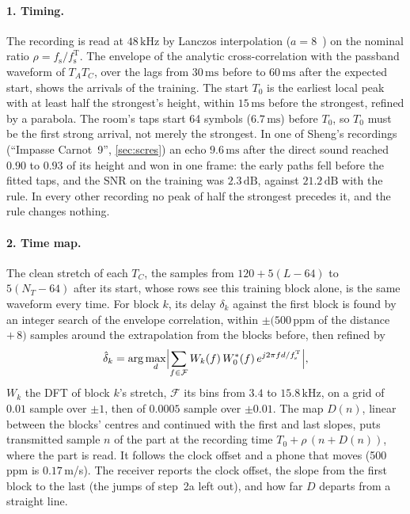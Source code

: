 \documentclass[11pt,a4paper]{article}
\newcommand{\kHz}{\,\mathrm{kHz}}
\newcommand{\ms}{\,\mathrm{ms}}
\newcommand{\dB}{\,\mathrm{dB}}
\newcommand{\fsT}{f_{\mathrm{s}}^{\mathrm{T}}}
\newcommand{\fs}{f_{\mathrm{s}}}
\theoremstyle{remark}
\begin{document}
\paragraph{1. Timing.}
The recording is read at $48\kHz$ by Lanczos interpolation ($a = 8$~\cite{duchon}) on the nominal ratio $\rho = \fs/\fsT$. The envelope of the analytic cross-correlation with the passband waveform of $T_A T_C$, over the lags from $30\ms$ before to $60\ms$ after the expected start, shows the arrivals of the training. The start $T_0$ is the earliest local peak with at least half the strongest's height, within $15\ms$ before the strongest, refined by a parabola. The room's taps start 64 symbols ($6.7\ms$) before $T_0$, so $T_0$ must be the first strong arrival, not merely the strongest. In one of Sheng's recordings (``Impasse Carnot~9'', \cref{sec:scres}) an echo $9.6\ms$ after the direct sound reached $0.90$ to $0.93$ of its height and won in one frame: the early paths fell before the fitted taps, and the SNR on the training was $2.3\dB$, against $21.2\dB$ with the rule. In every other recording no peak of half the strongest precedes it, and the rule changes nothing.

\paragraph{2. Time map.}
The clean stretch of each $T_C$, the samples from $120 + 5(L - 64)$ to $5(N_T - 64)$ after its start, whose rows see this training block alone, is the same waveform every time. For block $k$, its delay $\delta_k$ against the first block is found by an integer search of the envelope correlation, within $\pm(500$\,ppm of the distance $+\,8)$ samples around the extrapolation from the blocks before, then refined by
\begin{equation}
\hat\delta_k = \arg\max_{d} \Bigl| \sum_{f \in \mathcal F} W_k(f)\, W_0^*(f)\, e^{j2\pi f d/\fsT} \Bigr|,
\end{equation}
$W_k$ the DFT of block $k$'s stretch, $\mathcal F$ its bins from $3.4$ to $15.8\kHz$, on a grid of $0.01$ sample over $\pm 1$, then of $0.0005$ sample over $\pm 0.01$. The map $D(n)$, linear between the blocks' centres and continued with the first and last slopes, puts transmitted sample $n$ of the part at the recording time $T_0 + \rho\,(n + D(n))$, where the part is read. It follows the clock offset and a phone that moves (500\,ppm is $0.17$\,m/s). The receiver reports the clock offset, the slope from the first block to the last (the jumps of step~2a left out), and how far $D$ departs from a straight line.
\end{document}

